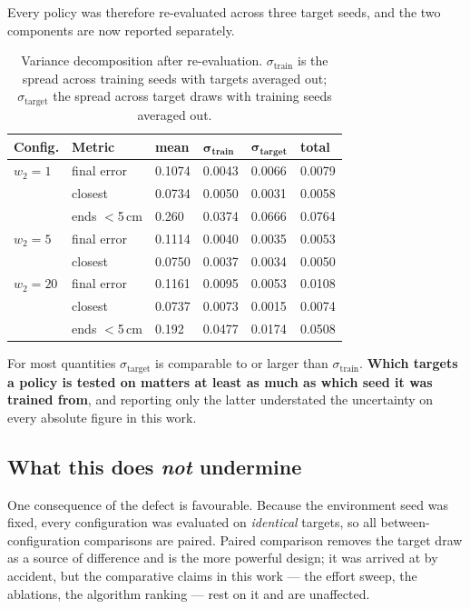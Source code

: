 Every policy was therefore re-evaluated across three target seeds, and the two
components are now reported separately.

\begin{table}[H]
\centering
\caption{Variance decomposition after re-evaluation. $\sigma_{\text{train}}$ is
the spread across training seeds with targets averaged out;
$\sigma_{\text{target}}$ the spread across target draws with training seeds
averaged out.}
\small
\begin{tabular}{@{} L{2.4cm} L{3.4cm} C{2.0cm} C{2.4cm} C{2.4cm} C{2.0cm} @{}}
\toprule
\textbf{Config.} & \textbf{Metric} & \textbf{mean} & $\boldsymbol{\sigma_{\text{train}}}$ & $\boldsymbol{\sigma_{\text{target}}}$ & \textbf{total} \\
\midrule
$w_2 = 1$  & final error & 0.1074 & 0.0043 & 0.0066 & 0.0079 \\
           & closest     & 0.0734 & 0.0050 & 0.0031 & 0.0058 \\
           & ends $<$5\,cm & 0.260 & 0.0374 & 0.0666 & 0.0764 \\
\midrule
$w_2 = 5$  & final error & 0.1114 & 0.0040 & 0.0035 & 0.0053 \\
           & closest     & 0.0750 & 0.0037 & 0.0034 & 0.0050 \\
\midrule
$w_2 = 20$ & final error & 0.1161 & 0.0095 & 0.0053 & 0.0108 \\
           & closest     & 0.0737 & 0.0073 & 0.0015 & 0.0074 \\
           & ends $<$5\,cm & 0.192 & 0.0477 & 0.0174 & 0.0508 \\
\bottomrule
\end{tabular}
\label{tab:variance}
\end{table}

For most quantities $\sigma_{\text{target}}$ is comparable to or larger than
$\sigma_{\text{train}}$. \textbf{Which targets a policy is tested on matters at
least as much as which seed it was trained from}, and reporting only the latter
understated the uncertainty on every absolute figure in this work.

\subsection*{What this does \emph{not} undermine}

One consequence of the defect is favourable. Because the environment seed was
fixed, every configuration was evaluated on \emph{identical} targets, so all
between-configuration comparisons are paired. Paired comparison removes the
target draw as a source of difference and is the more powerful design; it was
arrived at by accident, but the comparative claims in this work --- the effort
sweep, the ablations, the algorithm ranking --- rest on it and are unaffected.

